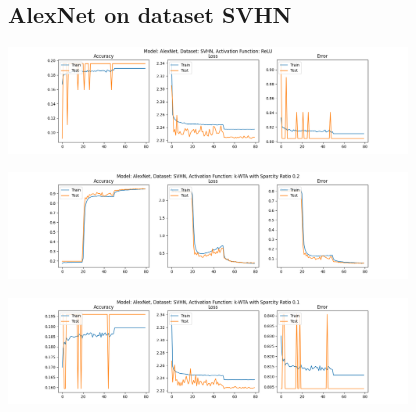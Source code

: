 \documentclass[a4paper]{article}
\begin{document}
		\subsection{AlexNet on dataset SVHN}
			\begin{center}
				\centering
				\includegraphics[width=400px,keepaspectratio]{Results/AlexNet_SVHN_ReLU}
			\end{center}
			\begin{center}
				\centering
				\includegraphics[width=400px,keepaspectratio]{Results/AlexNet_SVHN_k-WTA_0.2.png}
			\end{center}
			\begin{center}
				\centering
				\includegraphics[width=400px,keepaspectratio]{Results/AlexNet_SVHN_k-WTA_0.1.png}
			\end{center}
		
\end{document}
